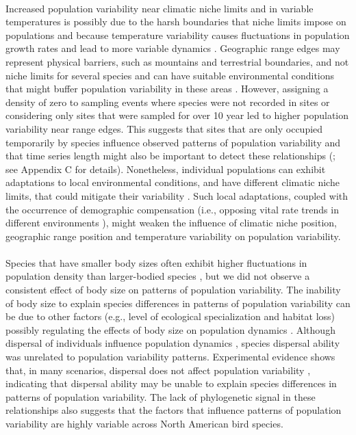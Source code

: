 \paragraph*{}
Increased population variability near climatic niche limits and in variable temperatures is possibly due to the harsh boundaries that niche limits impose on populations \parencite{sexton2009,hargreaves2014} and because temperature variability causes fluctuations in population growth rates and lead to more variable dynamics \parencite{lande1993}. Geographic range edges may represent physical barriers, such as mountains and terrestrial boundaries, and not niche limits for several species and can have suitable environmental conditions that might buffer population variability in these areas \parencite{oldfather2018,oldfather2019, pennington2021}. However, assigning a density of zero to sampling events where species were not recorded in sites or considering only sites that were sampled for over 10 year led to higher population variability near range edges. This suggests that sites that are only occupied temporarily by species influence observed patterns of population variability and that time series length might also be important to detect these relationships (\parencite{pimm1988}; see Appendix C for details). Nonetheless, individual populations can exhibit adaptations to local environmental conditions, and have different climatic niche limits, that could mitigate their variability \parencite{demarche2018,oldfather2019}. Such local adaptations, coupled with the occurrence of demographic compensation (i.e., opposing vital rate trends in different environments \parencite{doak2010,villellas2015}), might weaken the influence of climatic niche position, geographic range position and temperature variability on population variability.

\paragraph*{}
Species that have smaller body sizes often exhibit higher fluctuations in population density than larger-bodied species \parencite{lawton1994}, but we did not observe a consistent effect of body size on patterns of population variability. The inability of body size to explain species differences in patterns of population variability can be due to other factors (e.g., level of ecological specialization and habitat loss) possibly regulating the effects of body size on population dynamics \parencite{owens2000,cowlishaw2009}. Although dispersal of individuals influence population dynamics \parencite{doebeli1995, abbott2011}, species dispersal ability was unrelated to population variability patterns. Experimental evidence shows that, in many scenarios, dispersal does not affect population variability \parencite{yang2022}, indicating that dispersal ability may be unable to explain species differences in patterns of population variability. The lack of phylogenetic signal in these relationships also suggests that the factors that influence patterns of population variability are highly variable across North American bird species.

